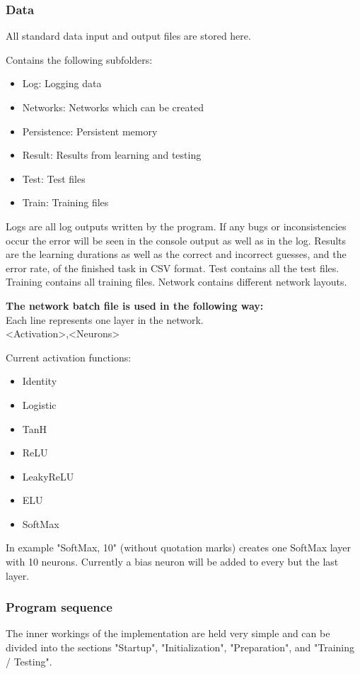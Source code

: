 \documentclass[11pt]{article}
\begin{document}
\subsubsection{Data}
All standard data input and output files are stored here.

Contains the following subfolders:
\begin{itemize}
\item Log: Logging data
\item Networks: Networks which can be created
\item Persistence: Persistent memory
\item Result: Results from learning and testing
\item Test: Test files
\item Train: Training files
\end{itemize}

Logs are all log outputs written by the program. If any bugs or inconsistencies occur the error will be seen in the console output as well as in the log.
Results are the learning durations as well as the correct and incorrect guesses, and the error rate, of the finished task in CSV format.
Test contains all the test files.
Training contains all training files.
Network contains different network layouts.

\textbf{The network batch file is used in the following way:}\\
Each line represents one layer in the network.\\
<Activation>,<Neurons>

Current activation functions:
\begin{itemize}
	\item Identity
	\item Logistic
	\item TanH
	\item ReLU\cite{pmlr-v15-glorot11a}
	\item LeakyReLU\cite{Maas2013RectifierNI}
	\item ELU\cite{DBLP:journals/corr/ClevertUH15}
	\item SoftMax
\end{itemize}

In example "SoftMax, 10" (without quotation marks) creates one SoftMax layer with 10 neurons. Currently a bias neuron will be added to every but the last layer.

\subsubsection{Program sequence}
The inner workings of the implementation are held very simple and can be divided into the sections "Startup", "Initialization", "Preparation", and "Training / Testing".
\end{document}
